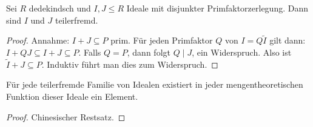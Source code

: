 \documentclass[ngerman, 11pt, a4paper, twoside, abstracton]{scrartcl}
\begin{document}
\begin{lemma}
  Sei $R$ dedekindsch und $I, J \le R$ Ideale mit disjunkter Primfaktorzerlegung. Dann sind $I$ und $J$ teilerfremd.
\end{lemma}
\begin{proof}
  Annahme: $I + J \subseteq P$ prim. Für jeden Primfaktor $Q$ von $I = Q\tilde{I}$ gilt dann: $I + QJ \subseteq I + J \subseteq P$. Falls $Q = P$, dann folgt $Q \mid J$, ein Widerspruch. Also ist $\tilde{I} + J \subseteq P$. Induktiv führt man dies zum Widerspruch.
\end{proof}

\begin{lemma}
  Für jede teilerfremde Familie von Idealen existiert in jeder mengentheoretischen Funktion dieser Ideale ein Element.
\end{lemma}
\begin{proof}
  Chinesischer Restsatz.
\end{proof}


\clearpage
\end{document}
